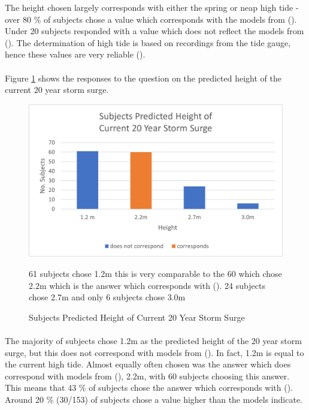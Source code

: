 The height chosen largely corresponds with either the spring or neap high tide - over 80 \% of subjects chose a value which corresponds with the models from (\cite{kartverket_se_2021}). Under 20 subjects responded with a value which does not reflect the models from (\cite{kartverket_se_2021}). The determination of high tide is based on recordings from the tide gauge, hence these values are very reliable (\cite{kartverket_se_2021}).
\paragraph{}
Figure \ref{fig:2022-stormsurge-answers} shows the responses to the question on the predicted height of the current 20 year storm surge. 
\begin{figure}[H]
    \centering
    \includegraphics{fig_results/2022-20yrss-answer.png}
    \caption{Subjects Predicted Height of Current 20 Year Storm Surge}{ 61 subjects chose 1.2m this is very comparable to the 60 which chose 2.2m which is the answer which corresponds with (\cite{kartverket_se_2021}). 24 subjects chose 2.7m and only 6 subjects chose 3.0m}
    \label{fig:2022-stormsurge-answers}
\end{figure}
\paragraph{}
The majority of subjects chose 1.2m as the predicted height of the 20 year storm surge, but this does not correspond with models from (\cite{kartverket_se_2021}). In fact, 1.2m is equal to the current high tide. Almost equally often chosen was the answer which does correspond with models from (\cite{kartverket_se_2021}), 2.2m, with 60 subjects choosing this answer. This means that 43 \% of subjects chose the answer which corresponds with (\cite{kartverket_se_2021}). Around 20 \% (30/153) of subjects chose a value higher than the models indicate.
